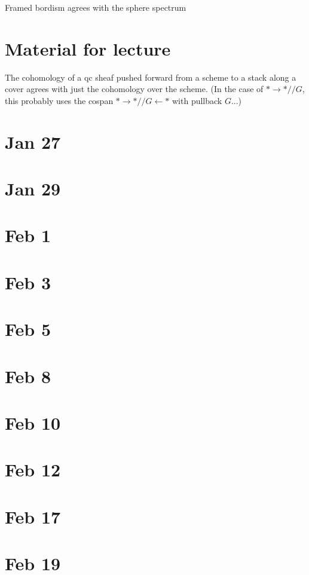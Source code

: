 \documentclass{amsart}
\newcommand{\<}{\langle}
\renewcommand{\>}{\rangle}
\newcommand{\mmod}{/\!\!/}
\theoremstyle{plain}
\theoremstyle{definition}
\theoremstyle{remark}
\begin{document}
Framed bordism agrees with the sphere spectrum


\section{Material for lecture}

The cohomology of a qc sheaf pushed forward from a scheme to a stack along a cover agrees with just the cohomology over the scheme. (In the case of $* \to * \mmod G$, this probably uses the cospan $* \to * \mmod G \leftarrow *$ with pullback $G$...)

\section{Jan 27}

\section{Jan 29}

\section{Feb 1}

\section{Feb 3}

\section{Feb 5}

\section{Feb 8}

\section{Feb 10}

\section{Feb 12}

\section{Feb 17}

\section{Feb 19}
\end{document}
